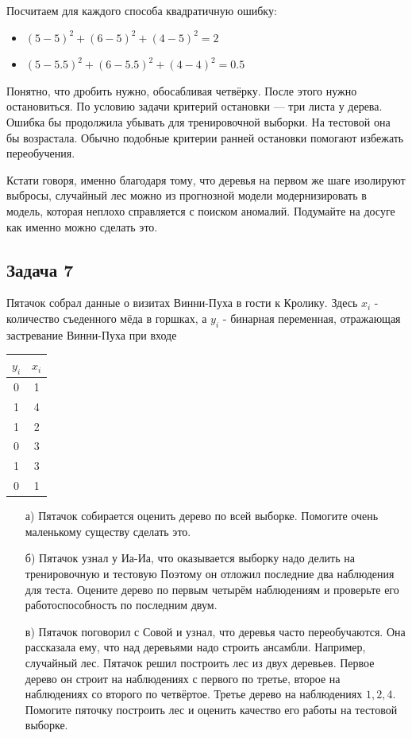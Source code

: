 \documentclass[12pt, a4paper, oneside]{article}
\begin{document}
{	Посчитаем для каждого способа квадратичную ошибку: 
	
	\begin{itemize}
		\item  $ (5 - 5)^2 + (6 - 5)^2 + (4 - 5)^2 = 2$
		\item  $ (5 - 5.5)^2 + (6 - 5.5)^2 + (4 - 4)^2  = 0.5$
	\end{itemize}
	
	Понятно, что дробить нужно, обосабливая четвёрку. После этого нужно остановиться. По условию задачи критерий остановки --- три листа у дерева. Ошибка бы продолжила убывать для тренировочной выборки. На тестовой она бы возрастала. Обычно подобные критерии ранней остановки помогают избежать переобучения.
	
	Кстати говоря, именно благодаря тому, что деревья на первом же шаге изолируют выбросы, случайный лес можно из прогнозной модели модернизировать в модель, которая неплохо справляется с поиском аномалий. Подумайте на досуге как именно можно сделать это. 
}


\subsection*{Задача 7}

Пятачок собрал данные о визитах Винни-Пуха в гости к Кролику. Здесь $x_i$ - количество съеденного мёда в горшках, а $y_i$  - бинарная переменная, отражающая застревание Винни-Пуха при входе 

\begin{center}
	\begin{tabular}{c|c}
		$y_i$ & $x_i$ \\
		\hline
		0  & 1 \\
		1 & 4\\
		1 & 2\\
		0 & 3 \\
		1 & 3 \\
		0 & 1
	\end{tabular}
\end{center}

\begin{enumerate}
	\item[а)] Пятачок собирается оценить дерево по всей выборке.  Помогите очень маленькому существу сделать это. 
	\item[б)] Пятачок узнал у Иа-Иа, что оказывается выборку надо делить на тренировочную и тестовую Поэтому он отложил последние два наблюдения для теста. Оцените дерево по первым четырём наблюдениям и проверьте его работоспособность по последним двум. 
	\item[в)]  Пятачок поговорил с Совой и узнал, что деревья часто переобучаются. Она рассказала ему, что над деревьями надо строить ансамбли. Например, случайный лес. Пятачок решил построить лес из двух деревьев. Первое дерево он строит на наблюдениях с первого по третье, второе на наблюдениях со второго по четвёртое.  Третье дерево на наблюдениях $1,2,4$. Помогите пяточку построить лес и оценить качество его работы на тестовой выборке. 
	
\end{enumerate}
\end{document}
